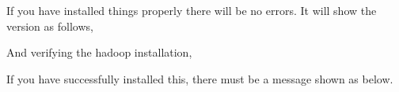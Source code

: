 \begin{Shaded}
\begin{Highlighting}[]
\NormalTok{$ } 
\NormalTok{$ } 
\end{Highlighting}
\end{Shaded}

If you have installed things properly there will be no errors. It will
show the version as follows,

\begin{Shaded}
\begin{Highlighting}[]
 
 
  
\end{Highlighting}
\end{Shaded}

And verifying the hadoop installation,

\begin{Shaded}
\begin{Highlighting}[]
\NormalTok{$ }
\end{Highlighting}
\end{Shaded}

If you have successfully installed this, there must be a message shown
as below.

